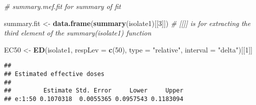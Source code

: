 \documentclass[
]{article}
\newenvironment{Shaded}{\begin{snugshade}}{\end{snugshade}}
\newcommand{\AttributeTok}[1]{\textcolor[rgb]{0.13,0.29,0.53}{#1}}
\newcommand{\CommentTok}[1]{\textcolor[rgb]{0.56,0.35,0.01}{\textit{#1}}}
\newcommand{\ConstantTok}[1]{\textcolor[rgb]{0.56,0.35,0.01}{#1}}
\newcommand{\ControlFlowTok}[1]{\textcolor[rgb]{0.13,0.29,0.53}{\textbf{#1}}}
\newcommand{\DecValTok}[1]{\textcolor[rgb]{0.00,0.00,0.81}{#1}}
\newcommand{\FloatTok}[1]{\textcolor[rgb]{0.00,0.00,0.81}{#1}}
\newcommand{\FunctionTok}[1]{\textcolor[rgb]{0.13,0.29,0.53}{\textbf{#1}}}
\newcommand{\NormalTok}[1]{#1}
\newcommand{\OtherTok}[1]{\textcolor[rgb]{0.56,0.35,0.01}{#1}}
\newcommand{\SpecialCharTok}[1]{\textcolor[rgb]{0.81,0.36,0.00}{\textbf{#1}}}
\newcommand{\StringTok}[1]{\textcolor[rgb]{0.31,0.60,0.02}{#1}}
\begin{document}
\begin{Shaded}
\begin{Highlighting}[]
\CommentTok{\# summary.mef.fit for \textquotesingle{}summary of fit\textquotesingle{}}

\NormalTok{summary.fit }\OtherTok{\textless{}{-}} \FunctionTok{data.frame}\NormalTok{(}\FunctionTok{summary}\NormalTok{(isolate1)[[}\DecValTok{3}\NormalTok{]]) }\CommentTok{\# [[]] is for extracting the third element of the summary(isolate1) function}

\NormalTok{EC50 }\OtherTok{\textless{}{-}} \FunctionTok{ED}\NormalTok{(isolate1, }\AttributeTok{respLev =} \FunctionTok{c}\NormalTok{(}\DecValTok{50}\NormalTok{), }\AttributeTok{type =} \StringTok{"relative"}\NormalTok{,}
           \AttributeTok{interval =} \StringTok{"delta"}\NormalTok{)[[}\DecValTok{1}\NormalTok{]]}
\end{Highlighting}
\end{Shaded}

\begin{verbatim}
## 
## Estimated effective doses
## 
##         Estimate Std. Error     Lower     Upper
## e:1:50 0.1070318  0.0055365 0.0957543 0.1183094
\end{verbatim}

\begin{Shaded}
\end{Shaded}
\end{document}
